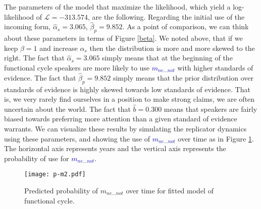 \documentclass[linguex]{sp}
\theoremstyle{definition} \newtheorem{definition}{Definition}
\begin{document}
The parameters of the model that maximize the likelihood, which yield a log-likelihood of $\mathcal{L} = -313.574$, are the following.  Regarding the initial use of the incoming form, $\hat{\alpha}_{s} = 3.065$, $\hat{\beta}_p =  9.852$. As a point of comparison, we can think about these parameters in terms of Figure \ref{beta}. We noted above, that if we keep $\beta=1$ and increase $\alpha_s$ then the distribution is more and more skewed to the right. The fact that $\hat{\alpha}_{s} = 3.065$ simply means that at the beginning of the functional cycle speakers are more likely to use \textcolor{blue}{$m_{ne...not}$} with higher standards of evidence. The fact that $\hat{\beta}_p =  9.852$ simply means that the prior distribution over standards of evidence is highly skewed towards low standards of evidence. That is, we very rarely find ourselves in a position to make strong claims, we are often uncertain about the world. The fact that $\hat{b}=0.300$ means that speakers are fairly biased towards preferring more attention than a given standard of evidence warrants. We can visualize these results by simulating the replicator dynamics using these parameters, and showing the use of \textcolor{blue}{$m_{ne...not}$} over time as in Figure \ref{m2-sol}. The horizontal axis represents years and the vertical axis represents the probability of use for \textcolor{blue}{$m_{ne...not}$}.  

\begin{figure}
\centering
     \texttt{[image: p-m2.pdf]}
\caption{Predicted probability of \textit{\color{blue} $m_{ne...not}$} over time for fitted model of functional cycle.}
\label{m2-sol}
\end{figure}
\end{document}
